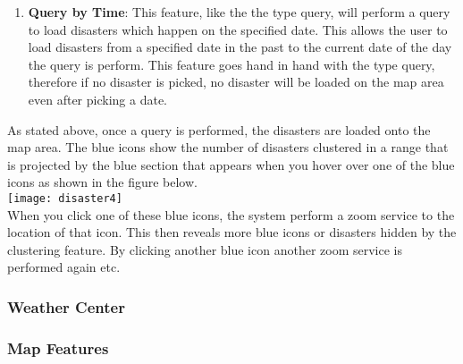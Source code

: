 \begin{enumerate}
\begin{enumerate}
		\item \textbf{Query by Time}: This feature, like the the type query, will perform a query to load disasters which happen on the specified date. This allows the user to load disasters from a specified date in the past to the current date of the day the query is perform. This feature goes hand in hand with the type query, therefore if no disaster is picked, no disaster will be loaded  on the map area even after picking a date.
		\end{enumerate}
		As stated above, once a query is performed, the disasters are loaded onto the map area. The blue icons show the number of disasters clustered in a range that is projected by the blue section that appears when you hover over one of the blue icons as shown in the figure below. \\[0.2cm]
		\texttt{[image: disaster4]} \\[0.5cm]
		When you click one of these blue icons, the system perform a zoom service to the location of that icon. This then reveals more blue icons or disasters hidden by the clustering feature. By clicking another blue icon another zoom service is performed again etc.
	\end{enumerate}
\subsubsection{Weather Center}
\subsubsection{Map Features}